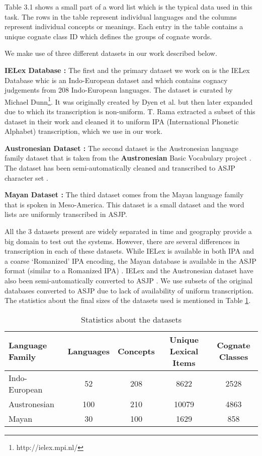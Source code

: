 Table 3.1 shows a small part of a word list which is the typical data used in this task. The rows in the table represent individual languages and the columns represent individual concepts or meanings. Each entry in the table contains a unique cognate class ID which defines the groups of cognate words.

We make use of three different datasets in our work described below. 

\textbf{IELex Database : } The first and the primary dataset we work on is the IELex Database whic is an Indo-European dataset and which contains cognacy judgements from 208 Indo-European languages. The dataset is curated by Michael Dunn\footnote{http://ielex.mpi.nl/}. It was originally created by Dyen et al.\citep{dyen1992indoeuropean} but then later expanded due to which its transcription is non-uniform. T. Rama extracted a subset of this dataset in their work \citep{rama2016siamese} and cleaned it to uniform IPA (International Phonetic Alphabet) transcription, which we use in our work. 

\textbf{Austronesian Dataset : } The second dataset is the Austronesian language family dataset that is taken from the \textbf{Austronesian} Basic Vocabulary project \citep{greenhillBlust:08}. The dataset has been semi-automatically cleaned and transcribed to ASJP character set \citep{rama2016siamese}.  

\textbf{Mayan Dataset : } The third dataset comes from the Mayan language family \citep{wichmann:2008} that is spoken in Meso-America. This dataset is a small dataset and the word lists are uniformly transcribed in ASJP. 

All the 3 datasets present are widely separated in time and geography provide a big domain to test out the systems. However, there are several differences in transcription in each of these datasets. While IELex is available in both IPA and a coarse `Romanized' IPA encoding, the Mayan database is available in the ASJP format (similar to a Romanized IPA) \citep{Brown:08}. IELex and the Austronesian dataset have also been semi-automatically converted to ASJP \citep{rama2016siamese}. We use subsets of the original databases converted to ASJP due to lack of availability of uniform transcription. The statistics about the final sizes of the datasets used is mentioned in Table \ref{datastat}.

\begin{table}[t]
\centering
\begin{tabular}{lcccc}
Language Family & Languages & Concepts & Unique Lexical Items & Cognate Classes \\ \hline
Indo-European   & 52        & 208      & 8622                & 2528            \\
Austronesian    & 100       & 210      & 10079                & 4863            \\
Mayan           & 30        & 100      & 1629                 & 858            
\end{tabular}
\caption{Statistics about the datasets}
\label{datastat}
\end{table}

